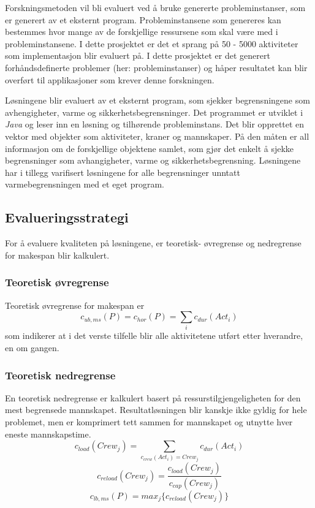 Forskningsmetoden vil bli evaluert ved å bruke genererte probleminstanser, som er generert av et eksternt program. Probleminstansene som genereres kan bestemmes hvor mange av de forskjellige ressursene som skal være med i probleminstansene. I dette prosjektet er det et sprang på 50 - 5000 aktiviteter som implementasjon blir evaluert på. I dette prosjektet er det generert forhåndsdefinerte problemer (her: probleminstanser) og håper resultatet kan blir overført til applikasjoner som krever denne forskningen.

Løsningene blir evaluert av et eksternt program, som sjekker begrensningene som avhengigheter, varme og sikkerhetsbegrensninger. Det programmet er utviklet i \textit{Java} og leser inn en løsning og tilhørende probleminstans. Det blir opprettet en vektor med objekter som aktiviteter, kraner og mannskaper. På den måten er all informasjon om de forskjellige objektene samlet, som gjør det enkelt å sjekke begrensninger som avhangigheter, varme og sikkerhetsbegrensning. Løsningene har i tillegg varifisert løsningene for alle begrensninger unntatt varmebegrensningen med et eget program.

\subsection{Evalueringsstrategi}
\label{sec:strategy}
For å evaluere kvaliteten på løsningene, er teoretisk- øvregrense og nedregrense for makespan blir kalkulert.

\subsubsection{Teoretisk øvregrense}
\label{sec:teoretiskovre}
Teoretisk øvregrense for makespan er
\begin{equation}
c_{ub,ms}(P) = c_{hor}(P) = \sum_{i} c_{dur}(Act_{i})
\end{equation}
som indikerer at i det verste tilfelle blir alle aktivitetene utført etter hverandre, en om gangen.

\subsubsection{Teoretisk nedregrense}
\label{sec:teoretisknedre}
En teoretisk nedregrense er kalkulert basert på ressurstilgjengeligheten for den mest begrensede mannskapet. Resultatløsningen blir kanskje ikke gyldig for hele problemet, men er komprimert tett sammen for mannskapet og utnytte hver eneste mannskapstime.
\begin{equation}
c_{load}(Crew_{j}) = \sum_{c_{crew}(Act_{i}) = Crew_{j}} c_{dur}(Act_{i})
\end{equation}
\begin{equation}
c_{reload}(Crew_{j}) = \frac{c_{load}(Crew_{j})}{c_{cap}(Crew_{j})}
\label{eq:mannskapsstyrke}
\end{equation}
\begin{equation}
c_{lb,ms}(P) = max_{j}\{ c_{reload}(Crew_{j}) \}
\end{equation}
